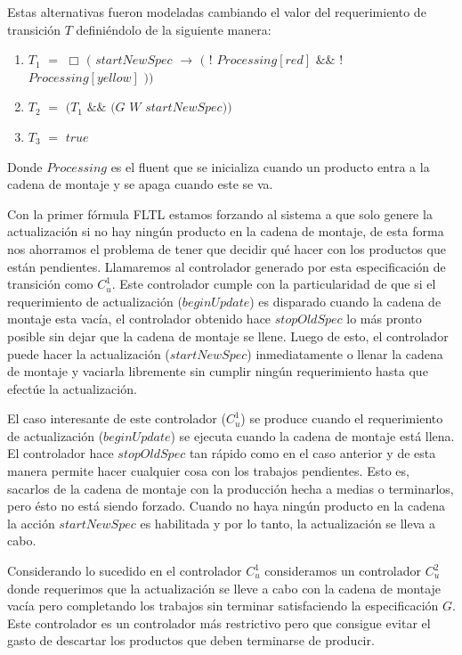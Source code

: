 Estas alternativas fueron modeladas cambiando el valor del requerimiento de transición $T$ definiéndolo de la siguiente
manera:

\begin{enumerate}
\item $T_1$ $=$ $\Box$ $($ $startNewSpec$ $\rightarrow$ $($ $!$ $Processing[red]$ $\&\&$ $!$ $Processing[yellow]$ $))$ 
\item $T_2$ $=$ $(T_1$ $\&\&$ $($$G$ $W$ $startNewSpec))$
\item $T_3$ $=$ $true$
\end{enumerate}

Donde $Processing$ es el fluent que se inicializa cuando un producto entra a la cadena de montaje y se apaga cuando este
se va.

Con la primer fórmula FLTL estamos forzando al sistema a que solo genere la actualización si no hay ningún producto en
la cadena de montaje, de esta forma nos ahorramos el problema de tener que decidir qué hacer con los productos que están
pendientes. Llamaremos al controlador generado por esta especificación de transición como $C_u^1$. Este controlador
cumple con la particularidad de que si el requerimiento de actualización ($beginUpdate$) es disparado cuando la cadena
de montaje esta vacía, el controlador obtenido hace $stopOldSpec$ lo más pronto posible sin dejar que la cadena de
montaje se llene. Luego de esto, el controlador puede hacer la actualización ($startNewSpec$) inmediatamente o llenar la
cadena de montaje y vaciarla libremente sin cumplir ningún requerimiento hasta que efectúe la actualización.

El caso interesante de este controlador ($C_u^1$) se produce cuando el requerimiento de actualización ($beginUpdate$) se
ejecuta cuando la cadena de montaje está llena. El controlador hace $stopOldSpec$ tan rápido como en el caso anterior y
de esta manera permite hacer cualquier cosa con los trabajos pendientes. Esto es, sacarlos de la cadena de montaje con
la producción hecha a medias o terminarlos, pero ésto no está siendo forzado. Cuando no haya ningún producto en la
cadena la acción $startNewSpec$ es habilitada y por lo tanto, la actualización se lleva a cabo.

Considerando lo sucedido en el controlador $C_u^1$ consideramos un controlador $C_u^2$ donde requerimos que la
actualización se lleve a cabo con la cadena de montaje vacía pero completando los trabajos sin terminar satisfaciendo la
especificación $G$. Este controlador es un controlador más restrictivo pero que consigue evitar el gasto de descartar
los productos que deben terminarse de producir. 

